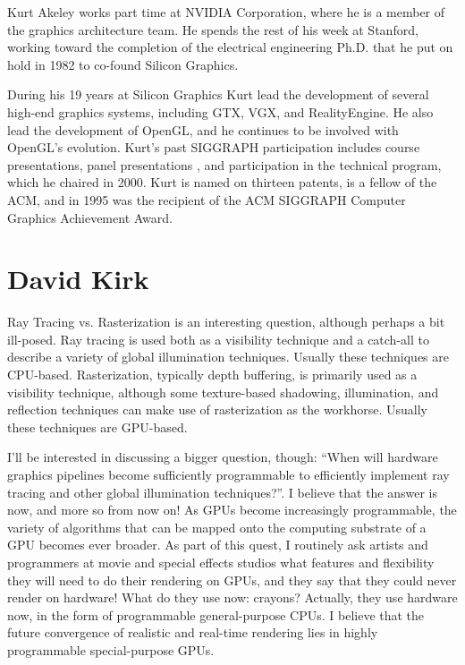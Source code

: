 \documentclass{acmsiggraph}
\begin{document}
Kurt Akeley works part time at NVIDIA Corporation, where he is a member
of the graphics architecture team.  He spends the rest of his week at
Stanford, working toward the completion of the electrical engineering
Ph.D. that he put on hold in 1982 to co-found Silicon Graphics.

During his 19 years at Silicon Graphics Kurt lead the development of
several high-end graphics systems, including GTX, VGX, and
RealityEngine.  He also lead the development of OpenGL, and he
continues to be involved with OpenGL's evolution.  Kurt's past
SIGGRAPH participation includes course presentations, panel
presentations , and participation in the technical program, which he
chaired in 2000.  Kurt is named on thirteen patents, is a fellow of
the ACM, and in 1995 was the recipient of the ACM SIGGRAPH Computer
Graphics Achievement Award.

\section{David Kirk}

Ray Tracing vs. Rasterization is an interesting question, although
perhaps a bit ill-posed.  Ray tracing is used both as a visibility
technique and a catch-all to describe a variety of global illumination
techniques.  Usually these techniques are CPU-based.  Rasterization,
typically depth buffering, is primarily used as a visibility
technique, although some texture-based shadowing, illumination, and
reflection techniques can make use of rasterization as the workhorse. 
Usually these techniques are GPU-based.

I'll be interested in discussing a bigger question, though: ``When will
hardware graphics pipelines become sufficiently programmable to
efficiently implement ray tracing and other global illumination
techniques?''.  I believe that the answer is now, and more so from now
on!  As GPUs become increasingly programmable, the variety of
algorithms that can be mapped onto the computing substrate of a GPU
becomes ever broader.  As part of this quest, I routinely ask artists
and programmers at movie and special effects studios what features and
flexibility they will need to do their rendering on GPUs, and they say
that they could never render on hardware!  What do they use now:
crayons?  Actually, they use hardware now, in the form of programmable
general-purpose CPUs.  I believe that the future convergence of
realistic and real-time rendering lies in highly programmable
special-purpose GPUs.
\newline
\end{document}
